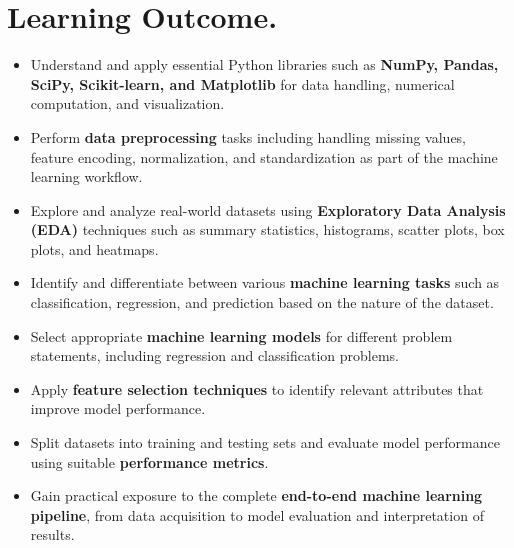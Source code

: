 \documentclass[11pt]{article}
\begin{document}
\section{Learning Outcome.}
\begin{itemize}
    \item Understand and apply essential Python libraries such as \textbf{NumPy, Pandas, SciPy, Scikit-learn, and Matplotlib} for data handling, numerical computation, and visualization.
    
    \item Perform \textbf{data preprocessing} tasks including handling missing values, feature encoding, normalization, and standardization as part of the machine learning workflow.
    
    \item Explore and analyze real-world datasets using \textbf{Exploratory Data Analysis (EDA)} techniques such as summary statistics, histograms, scatter plots, box plots, and heatmaps.
    
    \item Identify and differentiate between various \textbf{machine learning tasks} such as classification, regression, and prediction based on the nature of the dataset.
    
    \item Select appropriate \textbf{machine learning models} for different problem statements, including regression and classification problems.
    
    \item Apply \textbf{feature selection techniques} to identify relevant attributes that improve model performance.
    
    \item Split datasets into training and testing sets and evaluate model performance using suitable \textbf{performance metrics}.
    
    \item Gain practical exposure to the complete \textbf{end-to-end machine learning pipeline}, from data acquisition to model evaluation and interpretation of results.
\end{itemize}
\end{document}
